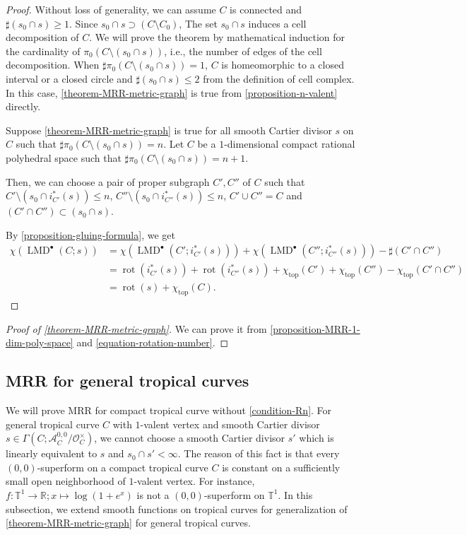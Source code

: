 \documentclass[a4paper,dvipdfmx,reqno,12pt]{amsart}
\theoremstyle{definition}
\newcommand{\opn}[1]{\operatorname{#1}}
\numberwithin{equation}{section}
\begin{document}
\begin{proof}
Without loss of generality, we can assume $C$ is 
connected and $\sharp (s_0\cap s)\geq 1$.
Since $s_0\cap s\supset (C\setminus C_0)$, 
The set $s_0\cap s$ induces a cell decomposition of 
$C$. We will prove the theorem by mathematical 
induction for the cardinality of 
$\pi_0(C\setminus (s_0 \cap s))$, i.e., the 
number of edges of the cell decomposition.
When $\sharp\pi_0(C\setminus (s_0 \cap s))=1$, 
$C$ is homeomorphic to a closed interval 
or a closed circle and 
$\sharp (s_0\cap s)\leq 2$ 
from the definition of cell complex.
In this case, \cref{theorem-MRR-metric-graph} is 
true from \cref{proposition-n-valent} directly.

Suppose \cref{theorem-MRR-metric-graph} is true
for all smooth Cartier divisor $s$ on 
$C$ such that $\sharp \pi_0(C\setminus (s_0 \cap s))=n$.
Let $C$ be a $1$-dimensional 
compact rational polyhedral space
such that $\sharp\pi_0(C\setminus (s_0 \cap s))=n+1$.

Then, we can choose a pair of proper subgraph $C',C''$ of
$C$ such that
$C'\setminus (s_0\cap i^{*}_{C'}(s))\leq n$,
$C''\setminus (s_0\cap i^{*}_{C''}(s))\leq n$,
$C'\cup C''=C$
and $(C'\cap C'')\subset (s_0\cap s)$.

By \cref{proposition-gluing-formula}, we get 
\begin{align*}
\chi(\opn{LMD}^{\bullet}(C;s))
&=\chi(\opn{LMD}^{\bullet}(C';i_{C'}^{*}(s)))
+\chi(\opn{LMD}^{\bullet}(C'';i_{C''}^{*}(s)))
-\sharp(C'\cap C'') \\
&=\opn{rot}(i_{C'}^{*}(s))
+\opn{rot}(i_{C''}^{*}(s))
+\chi_{\opn{top}}(C')+\chi_{\opn{top}}(C'')
-\chi_{\opn{top}}(C'\cap C'') \\
&=\opn{rot}(s)+\chi_{\opn{top}}(C).
\end{align*}

\end{proof}

\begin{proof}[{Proof of \cref{theorem-MRR-metric-graph}}]
We can prove it from \cref{proposition-MRR-1-dim-poly-space}
and \cref{equation-rotation-number}.
\end{proof}


\subsection{MRR for general tropical curves}
\label{section-tropical-curve-general}
We will prove MRR for compact tropical curve 
without \cref{condition-Rn}. 
For general tropical curve $C$ with $1$-valent
vertex and smooth Cartier divisor 
$s\in\Gamma(C;\mathcal{A}^{0,0}_C/\mathcal{O}^{\times}_C)$,
we cannot choose a smooth Cartier divisor $s'$ which
is linearly equivalent to $s$ and $s_0\cap s'<\infty$.
The reason of this fact is that every 
$(0,0)$-superform on a compact tropical curve 
$C$ is constant on a sufficiently
small open neighborhood of $1$-valent vertex.
For instance, 
$f\colon \mathbb{T}^1 \to \mathbb{R}; x\mapsto 
\opn{log}(1+e^{x})$ is not a $(0,0)$-superform
on $\mathbb{T}^{1}$.
In this subsection, we extend smooth functions
on tropical curves for generalization of 
\cref{theorem-MRR-metric-graph} for general 
tropical curves.
\end{document}
